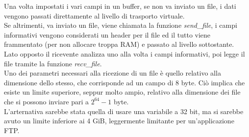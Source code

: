 Una volta impostati i vari campi in un buffer, se non va inviato un file, i dati vengono passati direttamente al livello di trasporto virtuale.\\
Se altrimenti, va inviato un file, viene chiamata la funzione \emph{send\_file}, i campi informativi vengono considerati un header per il file ed il tutto viene frammentato (per non allocare troppa RAM) e passato al livello sottostante.\\
Lato opposto il ricevente analizza uno alla volta i campi informativi, poi legge il file tramite la funzione \emph{recv\_file}.\\
Uno dei parametri necessari alla ricezione di un file è quello relativo alla dimensione dello stesso,
che corrisponde ad un campo di 8 byte. Ciò implica che esiste un limite superiore, seppur molto ampio,
relativo alla dimensione dei file che si possono inviare pari a $2^{64} - 1$ byte.\\
L'arternativa sarebbe stata quella di usare una variabile a 32 bit, ma si sarebbe avuto un limite inferiore ai 4 GiB,
leggermente limitante per un'applicazione FTP.

